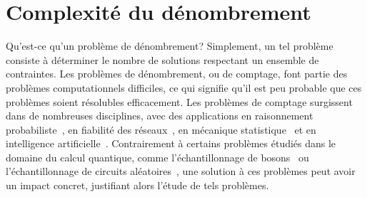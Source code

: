 \chapter{Complexité du dénombrement}
\label{cha:complexite-du-dénombrement}

Qu'est-ce qu'un problème de dénombrement? Simplement, un tel problème consiste à déterminer le nombre de solutions respectant un ensemble de contraintes. Les problèmes de dénombrement, ou de comptage, font partie des problèmes computationnels difficiles, ce qui signifie qu'il est peu probable que ces problèmes soient résolubles efficacement. Les problèmes de comptage surgissent dans de nombreuses disciplines, avec des applications en raisonnement probabiliste~\cite{rothHardnessApproximateReasoning1996, sangPerformingBayesianInference2005, abramsonHailfinderBayesianSystem1996}, en fiabilité des réseaux~\cite{valiantComplexityEnumerationReliability1979, duenas-osorioCountingBasedReliabilityEstimation2017}, en mécanique statistique~\cite{jerrumPolynomialtimeApproximationAlgorithms1993} et en intelligence artificielle~\cite{balutaQuantitativeVerificationNeural2019}. Contrairement à certains problèmes étudiés dans le domaine du calcul quantique, comme l'échantillonnage de bosons~\cite{aaronsonComputationalComplexityLinear2011} ou l'échantillonnage de circuits aléatoires~\cite{boulandComplexityVerificationQuantum2019}, une solution à ces problèmes peut avoir un impact concret, justifiant alors l'étude de tels problèmes.

